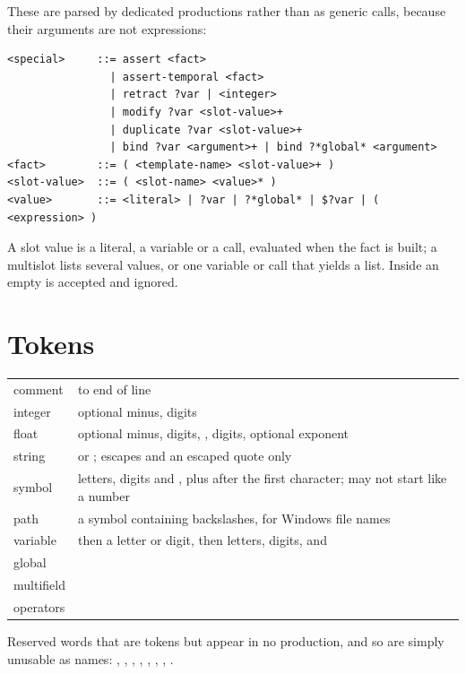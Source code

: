 These are parsed by dedicated productions rather than as generic calls,
because their arguments are not expressions:

\begin{lstlisting}[style=shell]
<special>     ::= assert <fact>
                | assert-temporal <fact>
                | retract ?var | <integer>
                | modify ?var <slot-value>+
                | duplicate ?var <slot-value>+
                | bind ?var <argument>+ | bind ?*global* <argument>
<fact>        ::= ( <template-name> <slot-value>+ )
<slot-value>  ::= ( <slot-name> <value>* )
<value>       ::= <literal> | ?var | ?*global* | $?var | ( <expression> )
\end{lstlisting}

A slot value is a literal, a variable or a call, evaluated when the fact
is built; a multislot lists several values, or one variable or call that
yields a list. Inside  an empty  is accepted and
ignored.

\section{Tokens}

\begin{center}
\begin{tabularx}{\textwidth}{lL}
\toprule
comment & \fn{;;} to end of line \\
integer & optional minus, digits \\
float & optional minus, digits, , digits, optional exponent \\
string &  or ; escapes \fn{\textbackslash\textbackslash} and an escaped quote only \\
symbol & letters, digits and , plus \fn{*} after the first character; may not start like a number \\
path & a symbol containing backslashes, for Windows file names \\
variable &  then a letter or digit, then letters, digits, \fn{-} and \fn{\_} \\
global &  \\
multifield &  \\
operators &  \\
\bottomrule
\end{tabularx}
\end{center}

Reserved words that are tokens but appear in no production, and so are
simply unusable as names: , ,
, , , ,
, .
